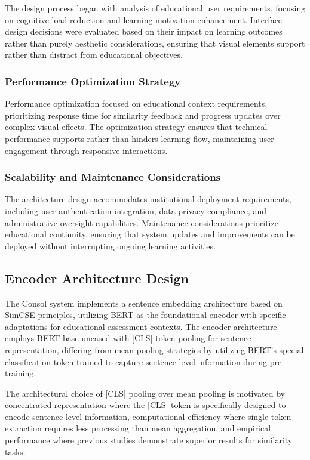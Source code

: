 {The design process began with analysis of educational user requirements, focusing on cognitive load reduction and learning motivation enhancement. Interface design decisions were evaluated based on their impact on learning outcomes rather than purely aesthetic considerations, ensuring that visual elements support rather than distract from educational objectives.

\subsubsection{Performance Optimization Strategy}

Performance optimization focused on educational context requirements, prioritizing response time for similarity feedback and progress updates over complex visual effects. The optimization strategy ensures that technical performance supports rather than hinders learning flow, maintaining user engagement through responsive interactions.

\subsubsection{Scalability and Maintenance Considerations}

The architecture design accommodates institutional deployment requirements, including user authentication integration, data privacy compliance, and administrative oversight capabilities. Maintenance considerations prioritize educational continuity, ensuring that system updates and improvements can be deployed without interrupting ongoing learning activities.

\subsection{Encoder Architecture Design}

The Consol system implements a sentence embedding architecture based on SimCSE principles, utilizing BERT as the foundational encoder with specific adaptations for educational assessment contexts. The encoder architecture employs BERT-base-uncased with [CLS] token pooling for sentence representation, differing from mean pooling strategies by utilizing BERT's special classification token trained to capture sentence-level information during pre-training.

The architectural choice of [CLS] pooling over mean pooling is motivated by concentrated representation where the [CLS] token is specifically designed to encode sentence-level information, computational efficiency where single token extraction requires less processing than mean aggregation, and empirical performance where previous studies demonstrate superior results for similarity tasks.

}
